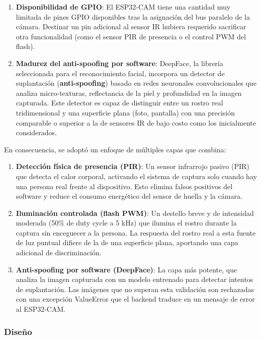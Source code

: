 \begin{enumerate}
    \item \textbf{Disponibilidad de GPIO}: El ESP32-CAM tiene una cantidad muy limitada de pines GPIO disponibles tras la asignación del bus paralelo de la cámara. Destinar un pin adicional al sensor IR hubiera requerido sacrificar otra funcionalidad (como el sensor PIR de presencia o el control PWM del flash).

    \item \textbf{Madurez del anti-spoofing por software}: DeepFace, la librería seleccionada para el reconocimiento facial, incorpora un detector de suplantación (\textbf{anti-spoofing}) basado en redes neuronales convolucionales que analiza micro-texturas, reflectancia de la piel y profundidad en la imagen capturada. Este detector es capaz de distinguir entre un rostro real tridimensional y una superficie plana (foto, pantalla) con una precisión comparable o superior a la de sensores IR de bajo costo como los inicialmente considerados.
\end{enumerate}

En consecuencia, se adoptó un enfoque de múltiples capas que combina:

\begin{enumerate}
    \item \textbf{Detección física de presencia (PIR)}: Un sensor infrarrojo pasivo (PIR) que detecta el calor corporal, activando el sistema de captura solo cuando hay una persona real frente al dispositivo. Esto elimina falsos positivos del software y reduce el consumo energético del sensor de huella y la cámara.
    \item \textbf{Iluminación controlada (flash PWM)}: Un destello breve y de intensidad moderada (50\% de duty cycle a 5 kHz) que ilumina el rostro durante la captura sin enceguecer a la persona. La respuesta del rostro real a esta fuente de luz puntual difiere de la de una superficie plana, aportando una capa adicional de discriminación.
    \item \textbf{Anti-spoofing por software (DeepFace)}: La capa más potente, que analiza la imagen capturada con un modelo entrenado para detectar intentos de suplantación. Las imágenes que no superan esta validación son rechazadas con una excepción ValueError que el backend traduce en un mensaje de error al ESP32-CAM.
\end{enumerate}

\subsubsection{Diseño}

